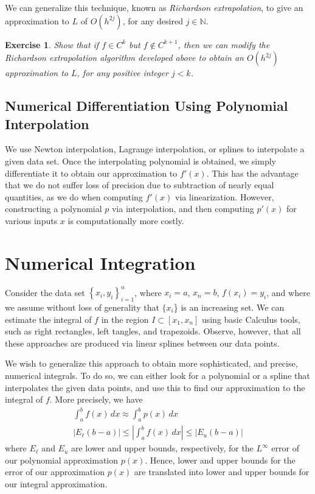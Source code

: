 \documentclass[12pt,reqno]{amsart}
\numberwithin{equation}{section}  %
\newtheorem*{exercise}{Exercise}
\begin{document}
We can generalize this technique, known as \emph{Richardson extrapolation},
to give an approximation to $L$ of
$O(h^{2j})$, for any desired $j \in \mathbb{N}$. 
\begin{exercise}
Show that if $f \in C^k$ but $f \not \in C^{k+1}$, then we can modify
the Richardson extrapolation algorithm developed above to obtain an 
$O(h^{2j})$ approximation to $L$, for any positive integer $j < k$.
\end{exercise}
\subsection{Numerical Differentiation Using Polynomial Interpolation}
We use Newton interpolation, Lagrange interpolation, or splines to interpolate a
given data set. Once the interpolating polynomial is obtained, we simply differentiate it
to obtain our approximation to $f'(x)$. This has the advantage
that we do not suffer loss of precision due to subtraction of nearly equal
quantities, as we do when computing $f'(x)$ via linearization. However,
constructing a polynomial $p$ via interpolation, and then computing $p'(x)$
for various inputs $x$ is computationally more costly. 
\section{Numerical Integration}
Consider the data set $ \left\{ x_i, y_i \right\}_{i=1}^{n}$, where $x_i = a$,
$x_n = b$, $f(x_i) = y_i$,
and where we assume without loss of generality that $\{x_i$\} is an
increasing set. We can estimate the integral of $f$ in the region $I \subset [x_1, x_n]$
using basic Calculus tools, such as right rectangles, left tangles, and trapezoids.
Observe, however, that all these approaches are produced via linear splines
between our data points. 

We wish to generalize this approach to obtain more sophisticated, and precise,
numerical integrals. To do so, we can either look for a polynomial or a spline
that interpolates the given data points, and use this to find our approximation
to the integral of $f$. More precisely, we have 
\begin{align*}
\int_a^b f(x)\, dx \approx \int_a^b p(x)\, dx
\\
|E_\ell(b-a)| \le | \int_a^b f(x) \, dx| \le |E_u (b-a)|
\end{align*}
where $E_\ell$ and $E_u$ are lower and upper bounds, respectively, for the $L^\infty$
error of our polynomial approximation $p(x)$. Hence, lower and upper bounds for the error of our approximation $p(x)$
are translated into lower and upper bounds for our integral approximation.
\end{document}
